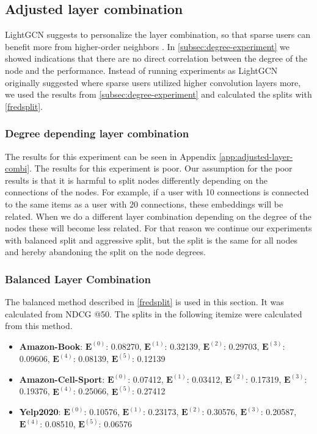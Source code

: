 \subsection{Adjusted layer combination}
LightGCN suggests to personalize the layer combination, so that sparse users can benefit more from higher-order neighbors \cite{lightgcn}.
In \autoref{subsec:degree-experiment} we showed indications that there are no direct correlation between the degree of the node and the performance.
Instead of running experiments as LightGCN originally suggested where sparse users utilized higher convolution layers more, we used the results from \autoref{subsec:degree-experiment} and calculated the splits with \autoref{fredsplit}.
\subsubsection{Degree depending layer combination}
The results for this experiment can be seen in Appendix \ref{app:adjusted-layer-combi}.
The results for this experiment is poor.
Our assumption for the poor results is that it is harmful to split nodes differently depending on the connections of the nodes.
For example, if a user with 10 connections is connected to the same items as a user with 20 connections, these embeddings will be related.
When we do a different layer combination depending on the degree of the nodes these will become less related.
For that reason we continue our experiments with balanced split and aggressive split, but the split is the same for all nodes and hereby abandoning the split on the node degrees.

\subsubsection{Balanced Layer Combination}
The balanced method described in \autoref{fredsplit} is used in this section.
It was calculated from NDCG @50.
The splits in the following itemize were calculated from this method.
\begin{itemize}
    \item \textbf{Amazon-Book}: $\mathbf{E}^{(0)}$: 0.08270, $\mathbf{E}^{(1)}$: 0.32139, $\mathbf{E}^{(2)}$: 0.29703, $\mathbf{E}^{(3)}$:  0.09606, $\mathbf{E}^{(4)}$: 0.08139, $\mathbf{E}^{(5)}$: 0.12139
    \item \textbf{Amazon-Cell-Sport}: $\mathbf{E}^{(0)}$: 0.07412, $\mathbf{E}^{(1)}$: 0.03412, $\mathbf{E}^{(2)}$: 0.17319, $\mathbf{E}^{(3)}$:  0.19376, $\mathbf{E}^{(4)}$: 0.25066, $\mathbf{E}^{(5)}$: 0.27412
    \item \textbf{Yelp2020}: $\mathbf{E}^{(0)}$: 0.10576, $\mathbf{E}^{(1)}$: 0.23173, $\mathbf{E}^{(2)}$: 0.30576, $\mathbf{E}^{(3)}$: 0.20587, $\mathbf{E}^{(4)}$: 0.08510, $\mathbf{E}^{(5)}$: 0.06576
\end{itemize}

